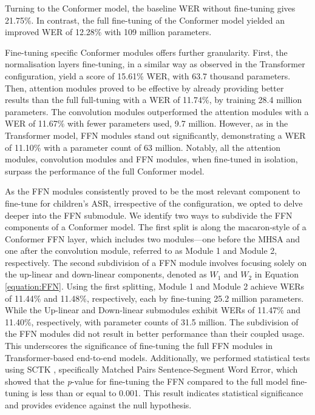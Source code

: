 Turning to the Conformer model, the baseline \ac{WER} without fine-tuning gives 21.75\%. In contrast, the full fine-tuning of the Conformer model yielded an improved \ac{WER} of 12.28\% with 109 million parameters.

Fine-tuning specific Conformer modules offers further granularity. First, the normalisation layers fine-tuning, in a similar way as observed in the Transformer configuration, yield a score of 15.61\% WER, with 63.7 thousand parameters. Then, attention modules proved to be effective by already providing better results than the full full-tuning with a \ac{WER} of 11.74\%, by training 28.4 million parameters. The convolution modules outperformed the attention modules with a \ac{WER} of 11.67\% with fewer parameters used, 9.7 million. However, as in the Transformer model, \ac{FFN} modules stand out significantly, demonstrating a \ac{WER} of 11.10\% with a parameter count of 63 million. Notably, all the attention modules, convolution modules and \ac{FFN} modules, when fine-tuned in isolation, surpass the performance of the full Conformer model.


As the \ac{FFN} modules consistently proved to be the most relevant component to fine-tune for children's \ac{ASR}, irrespective of the configuration, we opted to delve deeper into the \ac{FFN} submodule. We identify two ways to subdivide the \ac{FFN} components of a Conformer model. The first split is along the macaron-style of a Conformer \ac{FFN} layer, which includes two modules—one before the \ac{MHSA} and one after the convolution module, referred to as Module 1 and Module 2, respectively. The second subdivision of a \ac{FFN} module involves focusing solely on the up-linear and down-linear components, denoted as $W_1$ and $W_2$ in Equation \ref{equation:FFN}. Using the first splitting, Module 1 and Module 2 achieve \acp{WER} of 11.44\% and 11.48\%, respectively, each by fine-tuning 25.2 million parameters. While the Up-linear and Down-linear submodules exhibit \acp{WER} of 11.47\% and 11.40\%, respectively, with parameter counts of 31.5 million. The subdivision of the \ac{FFN} modules did not result in better performance than their coupled usage. This underscores the significance of fine-tuning the full \ac{FFN} modules in Transformer-based end-to-end models. Additionally, we performed statistical tests using SCTK \cite{SCTK_nist}, specifically Matched Pairs Sentence-Segment Word Error, which showed that the \textit{p}-value for fine-tuning the \ac{FFN} compared to the full model fine-tuning is less than or equal to 0.001. This result indicates statistical significance and provides evidence against the null hypothesis.

